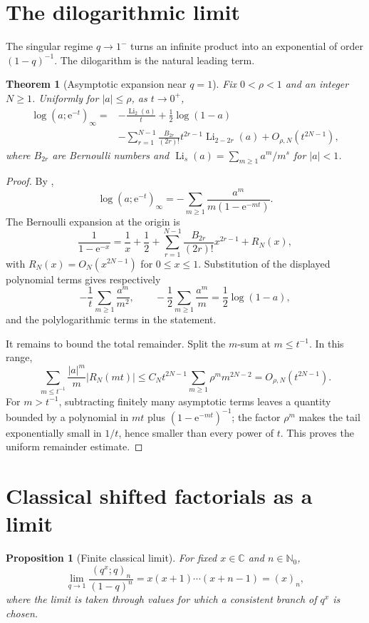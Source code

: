 \documentclass[11pt,oneside,openany]{book}
\newtheorem{theorem}{Theorem}[chapter]
\newtheorem{proposition}[proposition]{Proposition}
\theoremstyle{definition}
\theoremstyle{remark}
\newcommand{\C}{\mathbb C}
\newcommand{\N}{\mathbb N}
\newcommand{\Li}{\operatorname{Li}}
\newcommand{\e}{\mathrm e}
\newcommand{\abs}[1]{\lvert #1\rvert}
\begin{document}
\section{The dilogarithmic limit}

The singular regime $q\to1^-$ turns an infinite product into an exponential of order $(1-q)^{-1}$.  The dilogarithm is the natural leading term.

\begin{theorem}[Asymptotic expansion near $q=1$]\label{thm:poch-dilog}
Fix $0<\rho<1$ and an integer $N\ge1$.  Uniformly for $\abs a\le\rho$, as $t\to0^+$,
\[
\begin{aligned}
 \log(a;\e^{-t})_\infty
 ={}&-\frac{\Li_2(a)}{t}+\frac12\log(1-a)\\
 &-\sum_{r=1}^{N-1}\frac{B_{2r}}{(2r)!}
 t^{2r-1}\Li_{2-2r}(a)+O_{\rho,N}(t^{2N-1}),
\end{aligned}
\]
where $B_{2r}$ are Bernoulli numbers and
\(
 \Li_s(a)=\sum_{m\ge1}a^m/m^s
\)
for $\abs a<1$.
\end{theorem}

\begin{proof}
By ,
\[
 \log(a;\e^{-t})_\infty
 =-\sum_{m\ge1}\frac{a^m}{m(1-\e^{-mt})}.
\]
The Bernoulli expansion at the origin is
\[
 \frac1{1-\e^{-x}}
 =\frac1x+\frac12+\sum_{r=1}^{N-1}
 \frac{B_{2r}}{(2r)!}x^{2r-1}+R_N(x),
\]
with $R_N(x)=O_N(x^{2N-1})$ for $0\le x\le1$.  Substitution of the displayed polynomial terms gives respectively
\[
 -\frac1t\sum_{m\ge1}\frac{a^m}{m^2},
 \qquad
 -\frac12\sum_{m\ge1}\frac{a^m}{m}=\frac12\log(1-a),
\]
and the polylogarithmic terms in the statement.

It remains to bound the total remainder.  Split the $m$-sum at $m\le t^{-1}$.  In this range,
\[
 \sum_{m\le t^{-1}}\frac{\abs a^m}{m}\abs{R_N(mt)}
 \le C_Nt^{2N-1}\sum_{m\ge1}\rho^m m^{2N-2}
 =O_{\rho,N}(t^{2N-1}).
\]
For $m>t^{-1}$, subtracting finitely many asymptotic terms leaves a quantity bounded by a polynomial in $mt$ plus $(1-\e^{-mt})^{-1}$; the factor $\rho^m$ makes the tail exponentially small in $1/t$, hence smaller than every power of $t$.  This proves the uniform remainder estimate.
\end{proof}

\section{Classical shifted factorials as a limit}

\begin{proposition}[Finite classical limit]\label{prop:classical-poch-limit}
For fixed $x\in\C$ and $n\in\N_0$,
\[
 \lim_{q\to1}\frac{(q^x;q)_n}{(1-q)^n}
 =x(x+1)\cdots(x+n-1)=(x)_n,
\]
where the limit is taken through values for which a consistent branch of $q^x$ is chosen.
\end{proposition}
\end{document}
